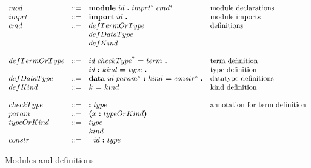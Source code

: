 \documentclass{article}
\begin{document}
\begin{figure}[h]
  \[
    \begin{array}{llll}
      \\ mod
      & ::= & \textbf{module}\ id\ \textbf{.}\ imprt^*\ cmd^*\
      & \textnormal{module declarations}
      \\ imprt
      & ::= & \textbf{import}\ id\ \textbf{.}
      & \textnormal{module imports}
      \\ cmd
      & ::= & defTermOrType
      & \textnormal{definitions}
      \\ & & defDataType
      \\ & & defKind
      \\ 
      \\ defTermOrType
      & ::= & id\ checkType^?\ \textbf{=}\ term\ \textbf{.}
      & \textnormal{term definition}
      \\ & & id\ \textbf{:}\ kind\ \textbf{=}\ type\ \textbf{.}
      & \textnormal{type definition}
      \\ defDataType
      & ::= & \textbf{data}\ id\ param^*\ \textbf{:}\ kind\ \textbf{=}\
              constr^*\ \textbf{.}
      & \textnormal{datatype definitions}
      \\ defKind
      & ::= & k\ \textbf{=}\ kind
      & \text{kind definition}
      \\ 
      \\ checkType
      & ::= & \textbf{:}\ type
      & \textnormal{annotation for term definition}
      \\ param
      & ::= & \textbf{(}x\ \textbf{:}\ typeOrKind \textbf{)}
      \\ typeOrKind
      & ::= & type
      \\ & & kind
      \\ constr
      & ::= & \textbf{\textbar}\ id\ \textbf{:}\ type
    \end{array}
  \]
  \caption{Modules and definitions}
\end{figure}
\end{document}
